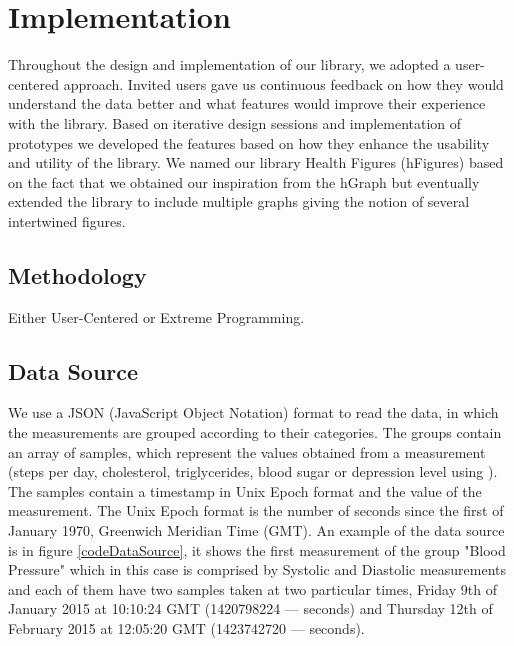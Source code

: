 \documentclass[twocolumn]{bmcart}%
\begin{document}
\section*{Implementation} 

Throughout the design and implementation of our library, we adopted a user-centered approach. Invited users gave us continuous feedback on how they would understand the data better and what features would improve their experience with the library. Based on iterative design sessions and implementation of prototypes we developed the features based on how they enhance the usability and utility of the library. We named our library Health Figures (hFigures) based on the fact that we obtained our inspiration from the hGraph but eventually extended the library to include multiple graphs giving the notion of several intertwined figures.


\subsection*{Methodology}

Either User-Centered or Extreme Programming.

\subsection*{Data Source}

We use a JSON (JavaScript Object Notation) format to read the data, in which the measurements are grouped according to their categories. The groups contain an array of samples, which represent the values obtained from a measurement (steps per day, cholesterol, triglycerides, blood sugar or depression level using \cite{poutanen2010validity}). The samples contain a timestamp in Unix Epoch format and the value of the measurement. The Unix Epoch format is the number of seconds since the first of January 1970, Greenwich Meridian Time (GMT). An example of the data source is in figure \ref{codeDataSource}, it shows the first measurement of the group "Blood Pressure" which in this case is comprised by Systolic and Diastolic measurements and each of them have two samples taken at two particular times, Friday 9th of January 2015 at 10:10:24 GMT (1420798224 --- seconds) and Thursday 12th of February 2015 at 12:05:20 GMT (1423742720 --- seconds).
\end{document}
